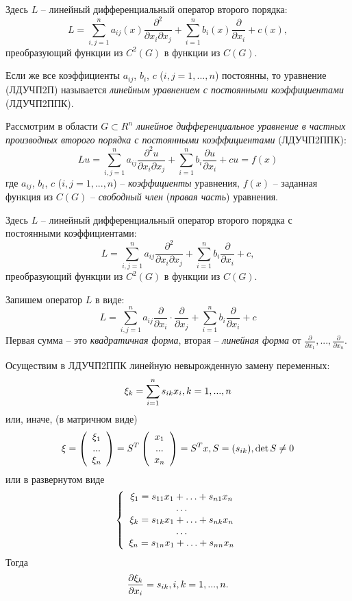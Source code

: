 Здесь $L$ -- линейный дифференциальный оператор второго порядка:
\[L=\sum _{i,j=1}^{n}a_{ij} (x)\frac{\partial ^{2} }{\partial x_{i} \partial x_{j} }  +\sum _{i=1}^{n}b_{i} (x)\frac{\partial }{\partial x_{i} }  +c(x),\]
преобразующий функции из $C^{2} (G)$ в функции из $C(G)$.

Если же все коэффициенты $a_{ij} $, $b_{i} $, $c$ ($i,j=1,...,n$) постоянны, то уравнение (ЛДУЧП2П) называется \textit{линейным уравнением с постоянными коэффициентами }(ЛДУЧП2ППК).

\bigskip

Рассмотрим в области $G\subset \mathit{R}^{n} $ \textit{линейное дифференциальное уравнение в частных производных второго порядка с постоянными коэффициентами}\textbf{ }(ЛДУЧП2ППК):
\[Lu=\sum _{i,j=1}^{n}a_{ij} \frac{\partial ^{2} u}{\partial x_{i} \partial x_{j} }  +\sum _{i=1}^{n}b_{i} \frac{\partial u}{\partial x_{i} }  +cu=f(x)\]
где $a_{ij} $, $b_{i} $, $c$ ($i,j=1,...,n$) -- \textit{коэффициенты} уравнения, $f(x)$ -- заданная функция из $C(G)$ -- \textit{свободный член} (\textit{правая часть}) уравнения.

\bigskip

Здесь $L$ -- линейный дифференциальный оператор второго порядка с постоянными коэффициентами:
\[L=\sum _{i,j=1}^{n}a_{ij} \frac{\partial ^{2} }{\partial x_{i} \partial x_{j} }  +\sum _{i=1}^{n}b_{i} \frac{\partial }{\partial x_{i} }  +c,\]
преобразующий функции из $C^{2} (G)$ в функции из $C(G)$.

\bigskip

Запишем оператор $L$ в виде:
\[L=\sum _{i,j=1}^{n}a_{ij} \frac{\partial }{\partial x_{i} } \cdot \frac{\partial }{\partial x_{j} }  +\sum _{i=1}^{n}b_{i} \frac{\partial }{\partial x_{i} }  +c\]
Первая сумма -- это \textit{квадратичная форма}, вторая -- \textit{линейная форма} от $\frac{\partial }{\partial x_{1} } ,...,\frac{\partial }{\partial x_{n} } $.

\noindent

Осуществим в ЛДУЧП2ППК  линейную невырожденную замену переменных:
\[{\rm \xi }_{k} =\sum _{i=1}^{n}s_{ik} x_{i}  ,   k=1,...,n\]
или, иначе, (в матричном виде)
\[{\rm \xi }=\left(\begin{array}{c} {{\rm \xi }_{1} } \\ {...} \\ {{\rm \xi }_{n} } \end{array}\right)=S^{T} \left(\begin{array}{c} {x_{1} } \\ {...} \\ {x_{n} } \end{array}\right)=S^{T} x,   S=(s_{ik} ),   \det S\ne 0\]
или в развернутом виде
\[\left\{\begin{array}{c} {{\rm \xi }_{1} =s_{11} x_{1} +\ldots +s_{n1} x_{n} } \\ {\ldots } \\ {{\rm \xi }_{k} =s_{1k} x_{1} +\ldots +s_{nk} x_{n} } \\ {\ldots } \\ {{\rm \xi }_{n} =s_{1n} x_{1} +\ldots +s_{nn} x_{n} } \end{array}\right. \]
Тогда
\[\frac{\partial {\rm \xi }_{k} }{\partial x_{i} } =s_{ik} ,   i,k=1,...,n.\]


